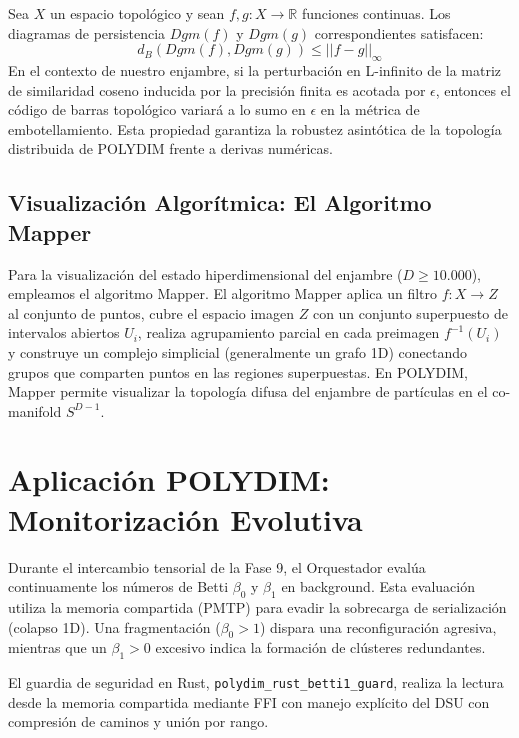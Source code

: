\begin{theorem}
Sea $X$ un espacio topológico y sean $f, g: X \to \mathbb{R}$ funciones continuas. Los diagramas de persistencia $Dgm(f)$ y $Dgm(g)$ correspondientes satisfacen:
$$ d_B(Dgm(f), Dgm(g)) \le || f - g ||_\infty $$
En el contexto de nuestro enjambre, si la perturbación en L-infinito de la matriz de similaridad coseno inducida por la precisión finita es acotada por $\epsilon$, entonces el código de barras topológico variará a lo sumo en $\epsilon$ en la métrica de embotellamiento. Esta propiedad garantiza la robustez asintótica de la topología distribuida de POLYDIM frente a derivas numéricas.
\end{theorem}

\subsection{Visualización Algorítmica: El Algoritmo Mapper}

Para la visualización del estado hiperdimensional del enjambre ($D \ge 10.000$), empleamos el algoritmo Mapper. El algoritmo Mapper aplica un filtro $f: X \to Z$ al conjunto de puntos, cubre el espacio imagen $Z$ con un conjunto superpuesto de intervalos abiertos $U_i$, realiza agrupamiento parcial en cada preimagen $f^{-1}(U_i)$ y construye un complejo simplicial (generalmente un grafo 1D) conectando grupos que comparten puntos en las regiones superpuestas. En POLYDIM, Mapper permite visualizar la topología difusa del enjambre de partículas en el co-manifold $S^{D-1}$.

\section{Aplicación POLYDIM: Monitorización Evolutiva}

Durante el intercambio tensorial de la Fase 9, el Orquestador evalúa continuamente los números de Betti $\beta_0$ y $\beta_1$ en background. Esta evaluación utiliza la memoria compartida (PMTP) para evadir la sobrecarga de serialización (colapso 1D). Una fragmentación ($\beta_0 > 1$) dispara una reconfiguración agresiva, mientras que un $\beta_1 > 0$ excesivo indica la formación de clústeres redundantes.

El guardia de seguridad en Rust, \texttt{polydim\_rust\_betti1\_guard}, realiza la lectura desde la memoria compartida mediante FFI con manejo explícito del DSU con compresión de caminos y unión por rango.

